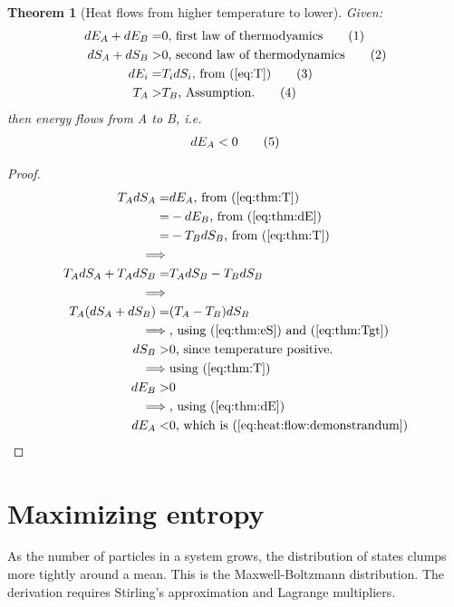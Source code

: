 \documentclass[]{article}
\newcommand\numberthis{\addtocounter{equation}{1}\tag{\theequation}}
\newtheorem{thm}{Theorem}
\begin{document}
\begin{thm}[Heat flows from higher temperature to lower]\label{thm:heat:flow}
	Given:
	\begin{align*}
	dE_A + dE_B =& 0 \text{, first law of thermodyamics}\numberthis \label{eq:thm:dE}\\
	dS_A + dS_B>& 0 \text{, second law of thermodynamics}\numberthis \label{eq:thm:eS} \\
	dE_i =& T_i dS_i \text{, from (\ref {eq:T})} \numberthis \label{eq:thm:T} \\
	T_A>&T_B \text{, Assumption.}\numberthis \label{eq:thm:Tgt}
	\end{align*}
	then energy flows from A to B, i.e.
	\begin{align*}
	dE_A<0\numberthis \label{eq:heat:flow:demonstrandum}
	\end{align*}
\end{thm}
\begin{proof}
	\begin{align*}
	T_A dS_A =& dE_A \text{, from (\ref{eq:thm:T})}\\
	=& - dE_B \text{, from (\ref{eq:thm:dE})}\\
	=& - T_B dS_B  \text{, from (\ref{eq:thm:T})}\\
	\implies&\\
	T_A dS_A + T_A dS_B =& T_A dS_B -T_B dS_B\\
	\implies&\\
	T_A (dS_A + dS_B) =& (T_A  -T_B) dS_B\\
	\implies& \text{, using (\ref{eq:thm:eS}) and (\ref{eq:thm:Tgt})}\\
	dS_B >& 0\text{, since temperature positive.}\\
	\implies& \text{using (\ref{eq:thm:T})}\\
	dE_B >& 0\\
	\implies& \text{, using (\ref{eq:thm:dE})}\\
	dE_A<&0\text{, which is (\ref{eq:heat:flow:demonstrandum})}
	\end{align*}
\end{proof}



\section{Maximizing entropy}


As the number of particles in a system grows, the distribution of states clumps more tightly around a mean. This is the Maxwell-Boltzmann distribution. The derivation requires Stirling's approximation and Lagrange multipliers.
\end{document}
